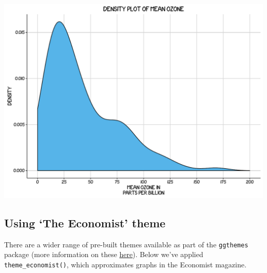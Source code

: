 \documentclass[]{article}
\begin{document}
\begin{center}\includegraphics{0_all_posts_pdf/density_10-1} \end{center}

\subsection{\texorpdfstring{Using `The Economist'
theme}{Using The Economist theme}}\label{using-the-economist-theme-7}

There are a wider range of pre-built themes available as part of the
\texttt{ggthemes} package (more information on these
\href{https://cran.r-project.org/web/packages/ggthemes/vignettes/ggthemes.html}{here}).
Below we've applied \texttt{theme\_economist()}, which approximates
graphs in the Economist magazine.
\end{document}
